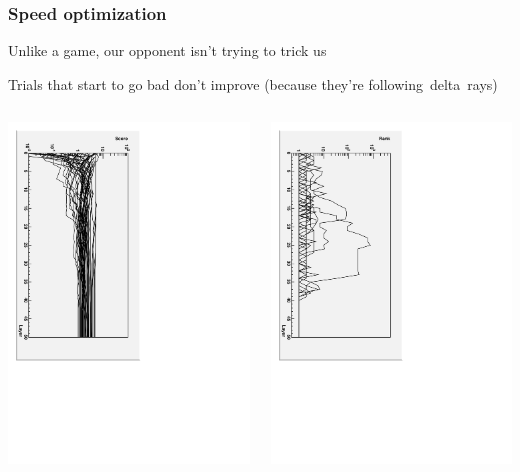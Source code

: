\documentclass[compress]{beamer}
\begin{document}
\begin{frame}
\frametitle{Speed optimization}

Unlike a game, our opponent isn't trying to trick us

Trials that start to go bad don't improve (because they're \mbox{following delta rays)\hspace{-1 cm}}

\vfill
\begin{columns}

\includegraphics[height=\linewidth, angle=90]{vslayer_score.pdf}

\includegraphics[height=\linewidth, angle=90]{vslayer_rank.pdf}


\end{columns}
\end{frame}
\end{document}
